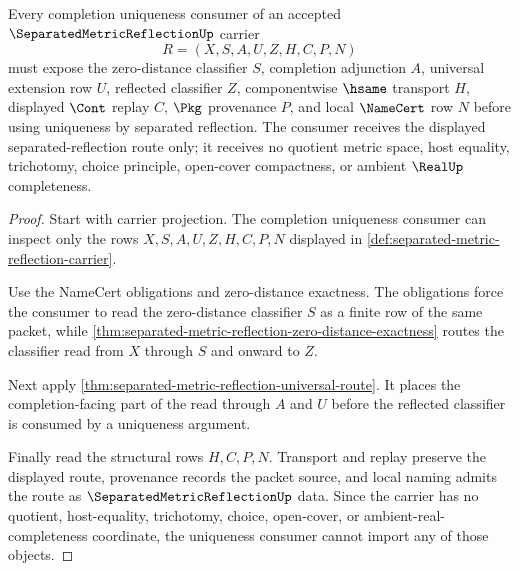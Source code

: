 \begin{theorem}
\label{thm:separated-metric-reflection-completion-uniqueness-route}
Every completion uniqueness consumer of an accepted $\SeparatedMetricReflectionUp$ carrier
$$
R=(X,S,A,U,Z,H,C,P,N)
$$
must expose the zero-distance classifier $S$, completion adjunction $A$, universal extension row $U$, reflected classifier $Z$, componentwise $\hsame$ transport $H$, displayed $\Cont$ replay $C$, $\Pkg$ provenance $P$, and local $\NameCert$ row $N$ before using uniqueness by separated reflection. The consumer receives the displayed separated-reflection route only; it receives no quotient metric space, host equality, trichotomy, choice principle, open-cover compactness, or ambient $\RealUp$ completeness.
\end{theorem}
\begin{proof}
Start with carrier projection. The completion uniqueness consumer can inspect only the rows $X,S,A,U,Z,H,C,P,N$ displayed in \autoref{def:separated-metric-reflection-carrier}.

Use the NameCert obligations and zero-distance exactness. The obligations force the consumer to read the zero-distance classifier $S$ as a finite row of the same packet, while \autoref{thm:separated-metric-reflection-zero-distance-exactness} routes the classifier read from $X$ through $S$ and onward to $Z$.

Next apply \autoref{thm:separated-metric-reflection-universal-route}. It places the completion-facing part of the read through $A$ and $U$ before the reflected classifier is consumed by a uniqueness argument.

Finally read the structural rows $H,C,P,N$. Transport and replay preserve the displayed route, provenance records the packet source, and local naming admits the route as $\SeparatedMetricReflectionUp$ data. Since the carrier has no quotient, host-equality, trichotomy, choice, open-cover, or ambient-real-completeness coordinate, the uniqueness consumer cannot import any of those objects.
\end{proof}

